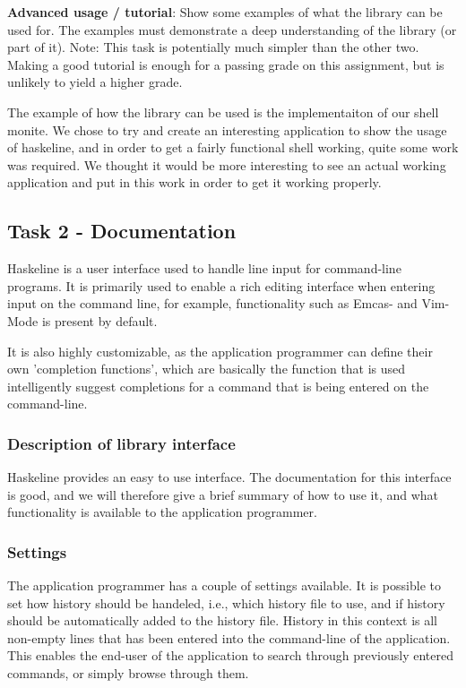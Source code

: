 \documentclass[11pt,a4paper]{article}
\begin{document}
\textbf{Advanced usage / tutorial}: Show some examples of what the library can be used
for. The examples must demonstrate a deep understanding of the library (or part
of it). Note: This task is potentially much simpler than the other two. Making a
good tutorial is enough for a passing grade on this assignment, but is unlikely
to yield a higher grade.

The example of how the library can be used is the implementaiton of our shell
monite. We chose to try and create an interesting application to show the usage
of haskeline, and in order to get a fairly functional shell working, quite some
work was required. We thought it would be more interesting to see an actual
working application and put in this work in order to get it working properly.

\subsection{Task 2 - Documentation}
Haskeline is a user interface used to handle line input for command-line
programs. It is primarily used to enable a rich editing interface when entering
input on the command line, for example, functionality such as Emcas- and
Vim-Mode is present by default.

It is also highly customizable, as the application programmer can define their
own 'completion functions', which are basically the function that is used
intelligently suggest completions for a command that is being entered on the
command-line.

\subsubsection{Description of library interface}
Haskeline provides an easy to use interface. The documentation for this
interface is good, and we will therefore give a brief summary of how to use it,
and what functionality is available to the application programmer.

\subsubsection{Settings}
The application programmer has a couple of settings available. It is possible to
set how history should be handeled, i.e., which history file to use, and if
history should be automatically added to the history file. History in this
context is all non-empty lines that has been entered into the command-line of
the application. This enables the end-user of the application to search through
previously entered commands, or simply browse through them.
\end{document}
